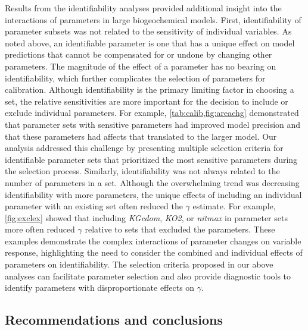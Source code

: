 \documentclass[preprint]{elsarticle}\usepackage[]{graphicx}\usepackage[]{color}
\begin{document}
Results from the identifiability analyses provided additional insight into the interactions of parameters in large biogeochemical models.  First, identifiability of parameter subsets was not related to the sensitivity of individual variables. As noted above, an identifiable parameter is one that has a unique effect on model predictions that cannot be compensated for or undone by changing other parameters. The magnitude of the effect of a parameter has no bearing on identifiability, which further complicates the selection of parameters for calibration.  Although identifiability is the primary limiting factor in choosing a set, the relative sensitivities are more important for the decision to include or exclude individual parameters.  For example, \cref{tab:calib,fig:areachg} demonstrated that parameter sets with sensitive parameters had improved model precision and that these parameters had affects that translated to the larger model. Our analysis addressed this challenge by presenting multiple selection criteria for identifiable parameter sets that prioritized the most sensitive parameters during the selection process.  Similarly, identifiability was not always related to the number of parameters in a set. Although the overwhelming trend was decreasing identifiability with more parameters, the unique effects of including an individual parameter with an existing set often reduced the $\gamma$ estimate. For example, \cref{fig:exclex} showed that including \textit{KGcdom}, \textit{KO2}, or \textit{nitmax} in parameter sets more often reduced $\gamma$ relative to sets that excluded the parameters.  These examples demonstrate the complex interactions of parameter changes on variable response, highlighting the need to consider the combined and individual effects of parameters on identifiability. The selection criteria proposed in our above analyses can facilitate parameter selection and also provide diagnostic tools to identify parameters with disproportionate effects on $\gamma$.

\subsection{Recommendations and conclusions}
\end{document}

